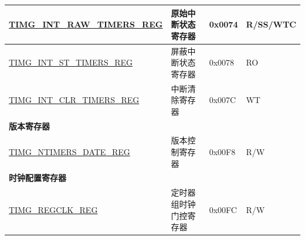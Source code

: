 \begin{longtable}{ | p{6cm} | p{7.2cm} | p{1.3cm} | p{1cm} | }
    \hyperref[regdesc:TIMGINTRAWTIMERSREG]{TIMG\_INT\_RAW\_TIMERS\_REG} & 原始中断状态寄存器 & 0x0074 & R/SS/WTC \\ \hline
    \hyperref[regdesc:TIMGINTSTTIMERSREG]{TIMG\_INT\_ST\_TIMERS\_REG} & 屏蔽中断状态寄存器 & 0x0078 & RO \\ \hline
    \hyperref[regdesc:TIMGINTCLRTIMERSREG]{TIMG\_INT\_CLR\_TIMERS\_REG} & 中断清除寄存器 & 0x007C & WT \\ \hline
    \multicolumn{4}{|l|}{\textbf{版本寄存器}} \\ \hline
    \hyperref[regdesc:TIMGNTIMERSDATEREG]{TIMG\_NTIMERS\_DATE\_REG} & 版本控制寄存器 & 0x00F8 & R/W \\ \hline
    \multicolumn{4}{|l|}{\textbf{时钟配置寄存器}} \\ \hline
    \hyperref[regdesc:TIMGREGCLKREG]{TIMG\_REGCLK\_REG} & 定时器组时钟门控寄存器 & 0x00FC & R/W \\ \hline
    \end{longtable}
